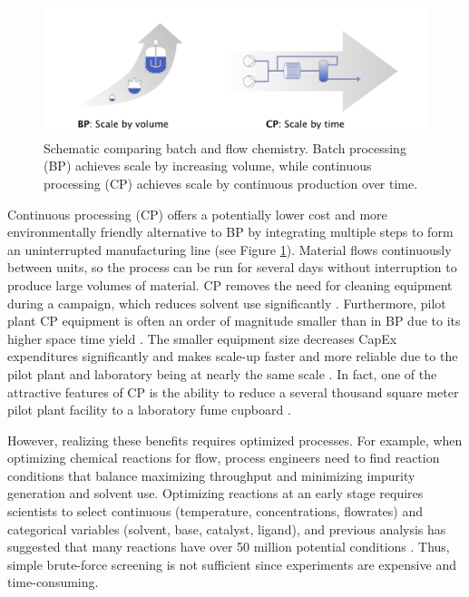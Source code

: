 \begin{figure}[bt]
  \includegraphics[height=0.2\textheight]{gfx/Chapter01/scale_up_schematic.png}
  \caption{Schematic comparing batch and flow chemistry. Batch processing (BP) achieves scale by increasing volume, while continuous processing (CP) achieves scale by continuous production over time.}
  \label{batch_v_flow}
\end{figure}

Continuous processing (CP) offers a potentially lower cost and more environmentally friendly alternative to BP by integrating multiple steps to form an uninterrupted manufacturing line (see Figure \ref{batch_v_flow}). Material flows continuously between units, so the process can be run for several days without interruption to produce large volumes of material. CP removes the need for cleaning equipment during a campaign, which reduces solvent use significantly \cite{Lee2016}. Furthermore, pilot plant CP equipment is often an order of magnitude smaller than in BP due to its higher space time yield \cite{Elvira2013}. The smaller equipment size decreases CapEx expenditures significantly \cite{Escriba-Gelonch2019} and makes scale-up faster and more reliable due to the pilot plant and laboratory being at nearly the same scale \cite{Cole2019, Rogers2019}. In fact, one of the attractive features of CP is the ability to reduce a several thousand square meter pilot plant facility to a laboratory fume cupboard \cite{Cole2017, Cole2019}.

However, realizing these benefits requires optimized processes. For example, when optimizing chemical reactions for flow, process engineers need to find reaction conditions that balance maximizing throughput and minimizing impurity generation and solvent use. Optimizing reactions at an early stage requires scientists to select continuous (temperature, concentrations, flowrates) and categorical variables (solvent, base, catalyst, ligand), and previous analysis has suggested that many reactions have over 50 million potential conditions \cite{Murray2013}. Thus, simple brute-force screening is not sufficient since experiments are expensive and time-consuming.

